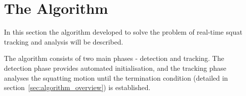\chapter{The Algorithm}

In this section the algorithm developed to solve the problem of real-time squat tracking and analysis will be described. 

The algorithm consists of two main phases - detection and tracking. The detection phase provides automated initialisation, and the tracking phase analyses the squatting motion until the termination condition (detailed in section~\ref{sec:algorithm_overview}) is established.



